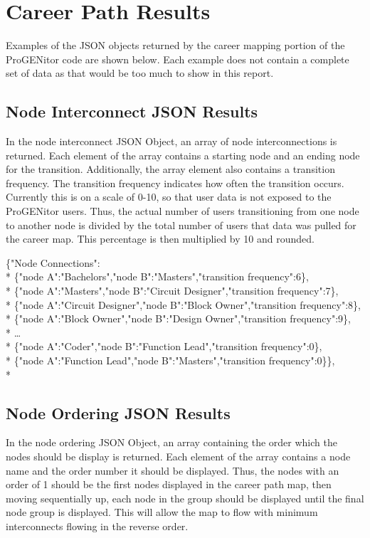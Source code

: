 \section{Career Path Results}
\label{sect:career-path-results}
Examples of the JSON objects returned by the career mapping portion of the
ProGENitor code are shown below.  Each example does not contain a complete set
of data as that would be too much to show in this report.

\subsection{Node Interconnect JSON Results}
In the node interconnect JSON Object, an array of node interconnections is
returned.  Each element of the array contains a starting node and an ending node
for the transition.  Additionally, the array element also contains a transition
frequency.  The transition frequency indicates how often the transition occurs. 
Currently this is on a scale of 0-10, so that user data is not exposed to the
ProGENitor users.  Thus, the actual number of users transitioning from one node
to another node is divided by the total number of users that data was pulled for
the career map.  This percentage is then multiplied by 10 and rounded.

\begin{tt}
\begin{footnotesize}
\noindent\{"Node Connections":\\*
\{"node A":"Bachelors","node B":"Masters","transition frequency":6\},\\*
\{"node A":"Masters","node 	B":"Circuit Designer","transition frequency":7\},\\*
\{"node A":"Circuit Designer","node B":"Block 	Owner","transition
 frequency":8\},\\* 
\{"node A":"Block Owner","node B":"Design Owner","transition frequency":9\},\\*
\ldots\\* 
\{"node A":"Coder","node B":"Function Lead","transition frequency":0\},\\*
\{"node A":"Function Lead","node B":"Masters","transition frequency":0\}\},\\*
\end{footnotesize}
\end{tt}


\subsection{Node Ordering JSON Results}
In the node ordering JSON Object, an array containing the order which the nodes
should be display is returned.  Each element of the array contains a node name
and the order number it should be displayed.  Thus, the nodes with an order of
1 should be the first nodes displayed in the career path map, then
moving sequentially up, each node in the group should be displayed until the
final node group is displayed.  This will allow the map to flow with minimum
interconnects flowing in the reverse order.

